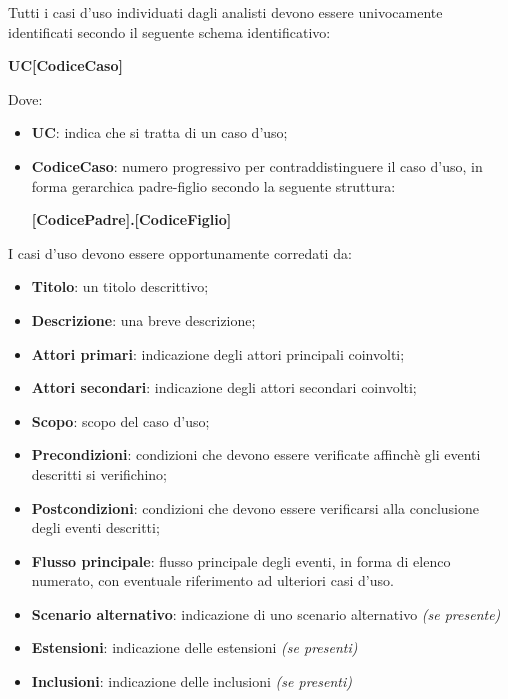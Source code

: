 Tutti i casi d'uso individuati dagli analisti devono essere univocamente identificati secondo il seguente schema identificativo:

\begin{center}
    \textbf{UC[CodiceCaso]}
\end{center}

Dove:

\begin{itemize}
    \item \textbf{UC}: indica che si tratta di un caso d'uso;
    \item \textbf{CodiceCaso}: numero progressivo per contraddistinguere il caso d'uso, in forma gerarchica padre-figlio secondo la seguente struttura:
    \begin{center}
        \textbf{[CodicePadre].[CodiceFiglio]}
    \end{center}
\end{itemize}

I casi d'uso devono essere opportunamente corredati da:

\begin{itemize}
    \item \textbf{Titolo}: un titolo descrittivo;
    \item \textbf{Descrizione}: una breve descrizione;
    \item \textbf{Attori primari}: indicazione degli attori principali coinvolti;
    \item \textbf{Attori secondari}: indicazione degli attori secondari coinvolti;
    \item \textbf{Scopo}: scopo del caso d'uso;
    \item \textbf{Precondizioni}: condizioni che devono essere verificate affinch\`{e} gli eventi descritti si verifichino;
    \item \textbf{Postcondizioni}: condizioni che devono essere verificarsi alla conclusione degli eventi descritti; 
    \item \textbf{Flusso principale}: flusso principale degli eventi, in forma di elenco numerato, con eventuale riferimento ad ulteriori casi d'uso.
    \item \textbf{Scenario alternativo}: indicazione di uno scenario alternativo \emph{(se presente)}
    \item \textbf{Estensioni}: indicazione delle estensioni \emph{(se presenti)}
    \item \textbf{Inclusioni}: indicazione delle inclusioni \emph{(se presenti)} 
\end{itemize}